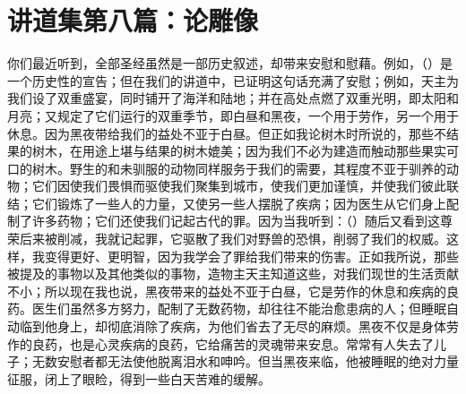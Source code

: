 

\section{讲道集第八篇：论雕像}

\par

你们最近听到，全部圣经虽然是一部历史叙述，却带来安慰和慰藉。例如，（）是一个历史性的宣告；但在我们的讲道中，已证明这句话充满了安慰；例如，天主为我们设了双重盛宴，同时铺开了海洋和陆地；并在高处点燃了双重光明，即太阳和月亮；又规定了它们运行的双重季节，即白昼和黑夜，一个用于劳作，另一个用于休息。因为黑夜带给我们的益处不亚于白昼。但正如我论树木时所说的，那些不结果的树木，在用途上堪与结果的树木媲美；因为我们不必为建造而触动那些果实可口的树木。野生的和未驯服的动物同样服务于我们的需要，其程度不亚于驯养的动物；它们因使我们畏惧而驱使我们聚集到城市，使我们更加谨慎，并使我们彼此联结；它们锻炼了一些人的力量，又使另一些人摆脱了疾病；因为医生从它们身上配制了许多药物；它们还使我们记起古代的罪。因为当我听到：（）随后又看到这尊荣后来被削减，我就记起罪，它驱散了我们对野兽的恐惧，削弱了我们的权威。这样，我变得更好、更明智，因为我学会了罪给我们带来的伤害。正如我所说，那些被提及的事物以及其他类似的事物，造物主天主知道这些，对我们现世的生活贡献不小；所以现在我也说，黑夜带来的益处不亚于白昼，它是劳作的休息和疾病的良药。医生们虽然多方努力，配制了无数药物，却往往不能治愈患病的人；但睡眠自动临到他身上，却彻底消除了疾病，为他们省去了无尽的麻烦。黑夜不仅是身体劳作的良药，也是心灵疾病的良药，它给痛苦的灵魂带来安息。常常有人失去了儿子；无数安慰者都无法使他脱离泪水和呻吟。但当黑夜来临，他被睡眠的绝对力量征服，闭上了眼睑，得到一些白天苦难的缓解。\par

